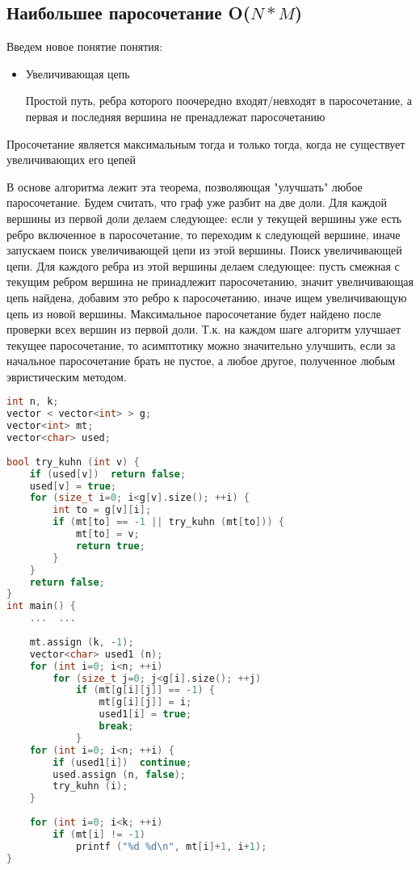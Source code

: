\subsection{Наибольшее паросочетание O($N*M$)}
Введем новое понятие понятия:
\begin{itemize}
\item 
    Увеличивающая цепь 
    \begin{mydef}
        Простой путь, ребра которого поочередно входят/невходят в паросочетание, а первая и последняя вершина не пренадлежат паросочетанию
    \end{mydef}
\end{itemize}
\begin{theorem}Просочетание является максимальным тогда и только тогда, когда не существует увеличивающих его цепей
\end{theorem}
В основе алгоритма лежит эта теорема, позволяющая "улучшать" любое паросочетание.\newline
Будем считать, что граф уже разбит на две доли. Для каждой вершины из первой доли делаем следующее: если у текущей вершины уже есть ребро включенное в паросочетание, то переходим к следующей вершине, иначе запускаем поиск увеличивающей цепи из этой вершины. 
Поиск увеличивающей цепи. \newline
Для каждого ребра из этой вершины делаем следующее: пусть смежная с текущим ребром вершина не принадлежит паросочетанию, значит увеличивающая цепь найдена, добавим это ребро к паросочетанию, иначе ищем увеличивающую цепь из новой вершины. Максимальное паросочетание будет найдено после проверки всех вершин из первой доли. \newline
Т.к. на каждом шаге алгоритм улучшает текущее паросочетание, то асимптотику можно значительно улучшить, если за начальное паросочетание брать не пустое, а любое другое, полученное любым эвристическим методом.
\begin{lstlisting}[language=C++]
int n, k;
vector < vector<int> > g;
vector<int> mt;
vector<char> used;
 
bool try_kuhn (int v) {
	if (used[v])  return false;
	used[v] = true;
	for (size_t i=0; i<g[v].size(); ++i) {
		int to = g[v][i];
		if (mt[to] == -1 || try_kuhn (mt[to])) {
			mt[to] = v;
			return true;
		}
	}
	return false;
}
int main() {
	...  ...
 
	mt.assign (k, -1);
	vector<char> used1 (n);
	for (int i=0; i<n; ++i)
		for (size_t j=0; j<g[i].size(); ++j)
			if (mt[g[i][j]] == -1) {
				mt[g[i][j]] = i;
				used1[i] = true;
				break;
			}
	for (int i=0; i<n; ++i) {
		if (used1[i])  continue;
		used.assign (n, false);
		try_kuhn (i);
	}
 
	for (int i=0; i<k; ++i)
		if (mt[i] != -1)
			printf ("%d %d\n", mt[i]+1, i+1);
}
\end{lstlisting}
